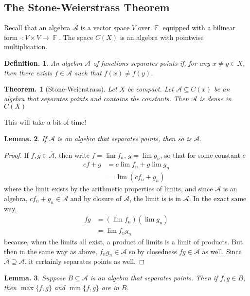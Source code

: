 \documentclass[11pt, a4paper]{memoir}
\DeclareMathOperator{\F}{{\mathbb{F}}}
\theoremstyle{change}
\newtheorem{theorem}{Theorem.}[section]
\newtheorem{lemma}[theorem]{Lemma.}
\theoremstyle{plain}
\theoremstyle{nonumberplain}
\newtheorem{definition}{Definition.}
\newtheorem{proof}{Proof}
\numberwithin{equation}{section}
\begin{document}
\subsection{The Stone-Weierstrass Theorem}
Recall that an algebra $\mathcal{A}$ is a vector space $V$ over $\F$ equipped with a bilinear form $\cdot:V\times V\to\F$.
The space $C(X)$ is an algebra with pointwise multiplication.
\begin{definition}
    An algebra $\mathcal{A}$ of functions separates points if, for any $x\neq y\in X$, then there exists $f\in\mathcal{A}$ such that $f(x)\neq f(y)$.
\end{definition}
\begin{theorem}[Stone-Weierstrass]
    Let $X$ be compact.
    Let $\mathcal{A}\subseteq C(x)$ be an algebra that separates points and contains the constants.
    Then $\mathcal{A}$ is dense in $C(X)$
\end{theorem}
This will take a bit of time!
\begin{lemma}
    If $\mathcal{A}$ is an algebra that separates points, then so is $\overline{\mathcal{A}}$.
\end{lemma}
\begin{proof}
    If $f,g\in\overline{\mathcal{A}}$, then write $f=\lim f_n$, $g=\lim g_n$, so that for some constant $c$
    \begin{align*}
        cf+g &= c\lim f_n+g\lim g_n\\
             &= \lim (cf_n+g_n)
    \end{align*}
    where the limit exists by the arithmetic properties of limits, and since $\mathcal{A}$ is an algebra, $cf_n+g_n\in\mathcal{A}$ and by closure of $\overline{\mathcal{A}}$, the limit is is in $\overline{\mathcal{A}}$.
    In the exact same way,
    \begin{align*}
        fg &= (\lim f_n)(\lim g_n)\\
           &= \lim f_ng_n
    \end{align*}
    because, when the limits all exist, a product of limits is a limit of products.
    But then in the same way as above, $f_ng_n\in\mathcal{A}$ so by closedness $fg\in\overline{\mathcal{A}}$ as well.
    Since $\overline{\mathcal{A}}\supseteq\mathcal{A}$, it certainly separates points as well.
\end{proof}
\begin{lemma}
    Suppose $B\subseteq\mathcal{A}$ is an algebra that separates points.
    Then if $f,g\in B$, then $\max\{f,g\}$ and $\min\{f,g\}$ are in $B$.
\end{lemma}
\end{document}
